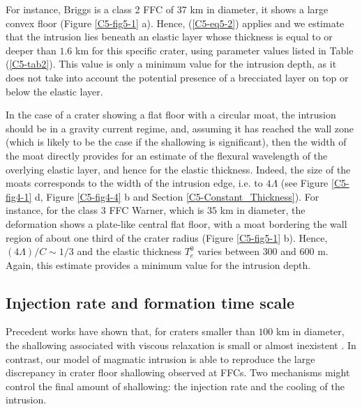 For instance, Briggs is a class 2 FFC of 37 km in diameter, it shows a
large    convex   floor    (Figure    \ref{C5-fig5-1}   a).     Hence,
(\ref{C5-eq5-2})  applies  and we  estimate  that  the intrusion  lies
beneath an  elastic layer whose thickness  is equal to or  deeper than
$1.6$ km  for this specific  crater, using parameter values  listed in
Table  (\ref{C5-tab2}). This  value is  only a  minimum value  for the
intrusion  depth, as  it  does  not take  into  account the  potential
presence of a brecciated layer on top or below the elastic layer.
		
In the case of a crater showing a flat floor with a circular moat, the
intrusion should be in a gravity  current regime, and, assuming it has
reached  the  wall  zone (which  is  likely  to  be  the case  if  the
shallowing  is  significant), then  the  width  of the  moat  directly
provides for an  estimate of the flexural wavelength  of the overlying
elastic layer, and hence for  the elastic thickness.  Indeed, the size
of the moats  corresponds to the width of the  intrusion edge, i.e. to
$4\Lambda$ (see Figure \ref{C5-fig4-1} d, Figure \ref{C5-fig4-4} b and
Section \ref{C5-Constant_Thickness}).   For instance, for the  class 3
FFC Warner,  which is  $35$ km  in diameter,  the deformation  shows a
plate-like central flat  floor, with a moat bordering  the wall region
of about  one third of  the crater radius (Figure  \ref{C5-fig5-1} b).
Hence, $(4\Lambda)/C\sim 1/3$ and the elastic thickness $T_e^0$ varies
between $300$ and  $600 $ m.  Again, this estimate  provides a minimum
value for the intrusion depth.
			
\subsection{Injection rate and formation time scale}
\label{C5-InjectionRateDiscussion}
		
Precedent works have shown that, for  craters smaller than $100$ km in
diameter, the  shallowing associated with viscous  relaxation is small
or almost  inexistent \citep{Dombard:2001gs}.  In contrast,  our model
of magmatic  intrusion is able  to reproduce the large  discrepancy in
crater floor shallowing observed at FFCs. Two mechanisms might control
the final amount of shallowing: the  injection rate and the cooling of
the intrusion.
		
